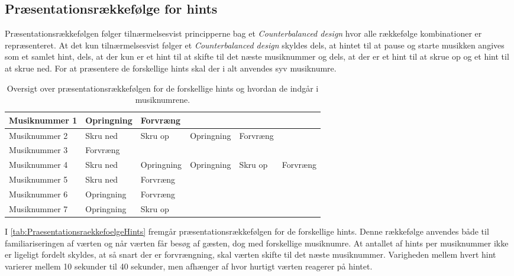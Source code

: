 \subsection{Præsentationsrækkefølge for hints}
\label{PraesentationsraekkefoelgeSocialAccept}
%
Præsentationsrækkefølgen følger tilnærmelsesvist principperne bag et \textit{Counterbalanced design} hvor alle rækkefølge kombinationer er repræsenteret. At det kun tilnærmelsesvist følger et \textit{Counterbalanced design} skyldes dels, at hintet til at pause og starte musikken angives som et samlet hint, dels, at der kun er et hint til at skifte til det næste musiknummer og dels, at der er et hint til at skrue op og et hint til at skrue ned. For at præsentere de forskellige hints skal der i alt anvendes syv musiknumre.
%
\begin{table}[H]
	\centering
	\begin{tabular}{ | p{2.8cm}| p{1.85cm}| p{1.85cm} | p{1.85cm} | p{1.85cm} | p{1.85cm}|}
		\hline
		Musiknummer 1 & Opringning & Forvræng & & & \\ \hline
		Musiknummer 2 & Skru ned & Skru op & Opringning & Forvræng & \\ \hline
		Musiknummer 3 & Forvræng & & & &  \\ \hline
		Musiknummer 4 & Skru ned & Opringning & Opringning & Skru op & Forvræng\\ \hline
		Musiknummer 5 & Skru ned & Forvræng & & & \\ \hline
		Musiknummer 6 & Opringning & Forvræng & & & \\ \hline
		Musiknummer 7 & Opringning & Skru op & & & \\ \hline
	\end{tabular}
	\caption{Oversigt over præsentationsrækkefølgen for de forskellige hints og hvordan de indgår i musiknumrene.}
	\label{tab:PraesentationsraekkefoelgeHints}
\end{table}
\noindent
%
I \autoref{tab:PraesentationsraekkefoelgeHints} fremgår præsentationsrækkefølgen for de forskellige hints. Denne rækkefølge anvendes både til familiariseringen af værten og når værten får besøg af gæsten, dog med forskellige musiknumre. At antallet af hints per musiknummer ikke er ligeligt fordelt skyldes, at så snart der er forvrængning, skal værten skifte til det næste musiknummer. Varigheden mellem hvert hint varierer mellem 10 sekunder til 40 sekunder, men afhænger af hvor hurtigt værten reagerer på hintet.   


